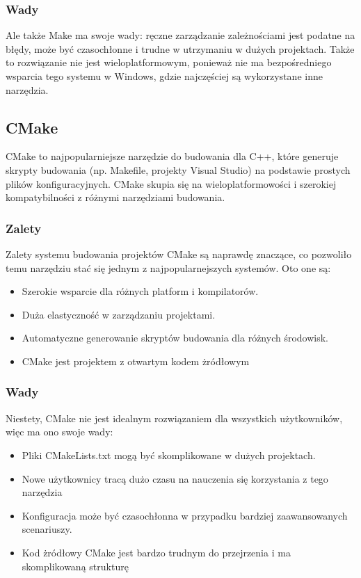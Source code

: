 \subsubsection{Wady}
Ale także Make ma swoje wady: ręczne zarządzanie zależnościami jest podatne na błędy, może być czasochłonne i trudne w utrzymaniu w dużych projektach. Także to rozwiązanie nie jest wieloplatformowym, ponieważ nie ma bezpośredniego wsparcia tego systemu w Windows, gdzie najczęściej są wykorzystane inne narzędzia.

\subsection{CMake}
CMake to najpopularniejsze narzędzie do budowania dla C++, które generuje skrypty budowania (np. Makefile, projekty Visual Studio) na podstawie prostych plików konfiguracyjnych. CMake skupia się na wieloplatformowości i szerokiej kompatybilności z różnymi narzędziami budowania.

\subsubsection{Zalety}
Zalety systemu budowania projektów CMake są naprawdę znaczące, co pozwoliło temu narzędziu stać się jednym z najpopularnejszych systemów. Oto one są:

\begin{itemize}
    \item Szerokie wsparcie dla różnych platform i kompilatorów.
    \item Duża elastyczność w zarządzaniu projektami.
    \item Automatyczne generowanie skryptów budowania dla różnych środowisk.
    \item CMake jest projektem z otwartym kodem żródłowym
\end{itemize}

\subsubsection{Wady}
Niestety, CMake nie jest idealnym rozwiązaniem dla wszystkich użytkowników, więc ma ono swoje wady:

\begin{itemize}
    \item Pliki CMakeLists.txt mogą być skomplikowane w dużych projektach.
    \item Nowe użytkownicy tracą dużo czasu na nauczenia się korzystania z tego narzędzia
    \item Konfiguracja może być czasochłonna w przypadku bardziej zaawansowanych scenariuszy.
    \item Kod żródłowy CMake jest bardzo trudnym do przejrzenia i ma skomplikowaną strukturę
\end{itemize}

